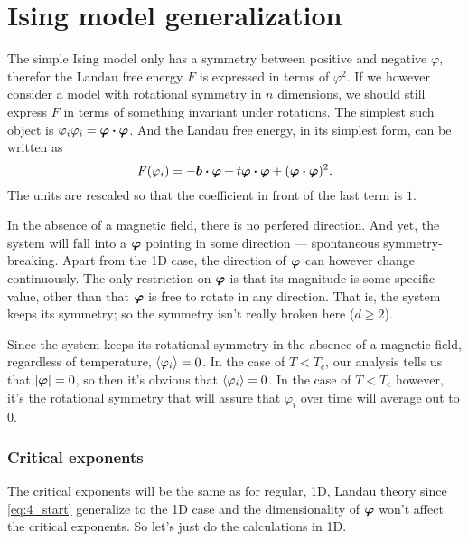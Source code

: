 \documentclass[11pt,letter, swedish, english
]{article}
\newcommand{\Tc}{\ensuremath{T_{\text{c}}}}
\begin{document}
\section{Ising model generalization}
The simple Ising model only has a symmetry between positive and
negative $\varphi$, therefor the Landau free energy $F$ is expressed in
terms of $\varphi^2$. If we however consider a model with rotational
symmetry in $n$ dimensions, we should still express $F$ in terms of
something invariant under rotations. The simplest such object is
$\varphi_i\varphi_i=\vb*{\varphi}\vdot\vb*{\varphi}$. And the Landau
free energy, in its simplest form, can be written as
\begin{equation}\label{eq:4_start}
F(\varphi_i)=-\vb*{b}\vdot\vb*{\varphi}+t\vb*{\varphi}\vdot\vb*{\varphi}
+(\vb*{\varphi}\vdot\vb*{\varphi})^2.
\end{equation}
The units are rescaled so that the coefficient in front of the
last term is $1$. 

In the absence of a magnetic field, there is no perfered
direction. And yet, the system will fall into a $\vb*\varphi$ pointing
in some direction --- spontaneous symmetry-breaking. Apart from the 1D
case, the direction of $\vb*\varphi$ can however change continuously. The only
restriction on $\vb*\varphi$ is that its magnitude is some specific
value, other than that $\vb*\varphi$ is free to rotate in any
direction. That is, the system keeps its symmetry; so the symmetry
isn't really broken here ($d\ge2$).

Since the system keeps its rotational symmetry in the absence of a
magnetic field, regardless of temperature, $\ev{\varphi_i}=0$. In the
case of $T<\Tc$, our analysis tells us that $|\vb*\varphi|=0$, so then
it's obvious that $\ev{\varphi_i}=0$. In the case of $T<\Tc$ however,
it's the rotational symmetry that will assure that $\varphi_i$ over
time will average out to 0. 





\subsubsection*{Critical exponents}
The critical exponents will be the same as for regular, 1D, Landau
theory since \eqref{eq:4_start} generalize to the 1D case and the
dimensionality of $\vb*\varphi$ won't affect the critical exponents. 
So let's just do the calculations in 1D\footnotemark{}.
\end{document}
